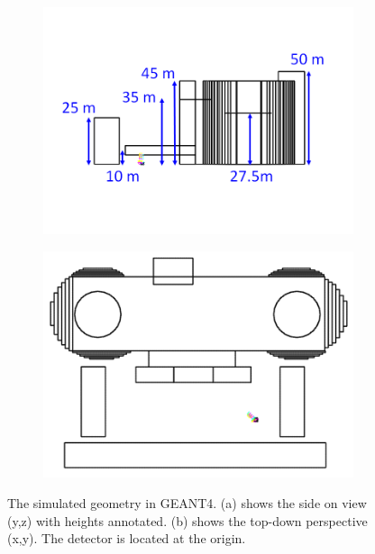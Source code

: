 \begin{figure}[!h]
\centering
\begin{subfigure}{.5\textwidth}
  \centering
  \includegraphics[width=0.9\linewidth]{Chapter5/Figs/wylfaRasterNew/WylfaSimGeomSideOn.png}
  \captionsetup{width=.9\linewidth}
  \caption{}
  \label{subFig:WylfaSimGeomSideOn}
\end{subfigure}%
\begin{subfigure}{.5\textwidth}
  \centering
\includegraphics[width=0.9\linewidth]{Chapter5/Figs/wylfaRasterNew/WylfaSimGeomTopDown.png}
  \captionsetup{width=.9\linewidth}
  \caption{}
  \label{subFig:WylfaSimGeomTopDown}
\end{subfigure}
\caption[The simulated geometry in GEANT4.]{The simulated geometry in GEANT4. (a) shows the side on view (y,z) with heights annotated. (b) shows the top-down perspective (x,y). The detector is located at the origin.}
\label{fig:WylfaSimGeom_SideOn_TopDown}
\end{figure}

